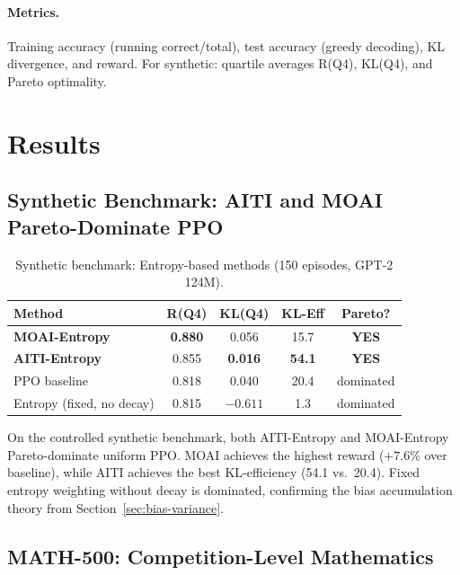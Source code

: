\documentclass[11pt,a4paper]{article}
\begin{document}
\paragraph{Metrics.} Training accuracy (running correct/total), test accuracy (greedy decoding), KL divergence, and reward. For synthetic: quartile averages R(Q4), KL(Q4), and Pareto optimality.

\section{Results}
\label{sec:results}

\subsection{Synthetic Benchmark: AITI and MOAI Pareto-Dominate PPO}

\begin{table}[h]
\centering
\caption{Synthetic benchmark: Entropy-based methods (150 episodes, GPT-2 124M).}
\label{tab:synthetic}
\begin{tabular}{lcccc}
\toprule
\textbf{Method} & \textbf{R(Q4)} & \textbf{KL(Q4)} & \textbf{KL-Eff} & \textbf{Pareto?} \\
\midrule
\textbf{MOAI-Entropy} & \textbf{0.880} & 0.056 & 15.7 & \textbf{YES} \\
\textbf{AITI-Entropy} & 0.855 & \textbf{0.016} & \textbf{54.1} & \textbf{YES} \\
PPO baseline & 0.818 & 0.040 & 20.4 & dominated \\
Entropy (fixed, no decay) & 0.815 & $-0.611$ & 1.3 & dominated \\
\bottomrule
\end{tabular}
\end{table}

On the controlled synthetic benchmark, both AITI-Entropy and MOAI-Entropy Pareto-dominate uniform PPO. MOAI achieves the highest reward ($+7.6\%$ over baseline), while AITI achieves the best KL-efficiency (54.1 vs.\ 20.4). Fixed entropy weighting without decay is dominated, confirming the bias accumulation theory from Section~\ref{sec:bias-variance}.

\subsection{MATH-500: Competition-Level Mathematics}
\end{document}
